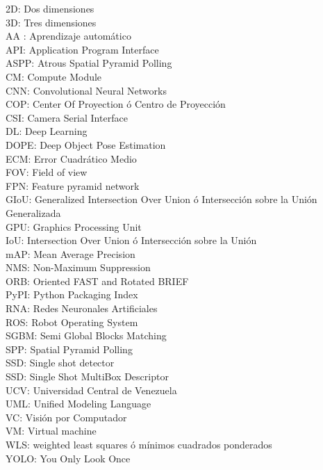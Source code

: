 2D: Dos dimensiones \\
3D: Tres dimensiones\\
AA : Aprendizaje automático \\
API: Application Program Interface \\
ASPP: Atrous Spatial Pyramid Polling\\ 
CM: Compute Module \\
CNN: Convolutional Neural Networks\\
COP: Center Of Proyection ó Centro de Proyección\\
CSI: Camera Serial Interface \\
DL: Deep Learning \\
DOPE: Deep Object Pose Estimation \\
ECM: Error Cuadrático Medio \\
FOV: Field of view\\
FPN: Feature pyramid network \\
GIoU: Generalized Intersection Over Union ó Intersección sobre la Unión Generalizada\\
GPU: Graphics  Processing Unit\\
IoU: Intersection Over Union ó Intersección sobre la Unión\\
mAP: Mean Average Precision \\
NMS: Non-Maximum Suppression \\
ORB: Oriented FAST and Rotated BRIEF\\
PyPI: Python Packaging Index \\
RNA: Redes Neuronales Artificiales \\
ROS: Robot Operating System\\
SGBM: Semi Global Blocks Matching \\
SPP: Spatial Pyramid Polling \\
SSD: Single shot detector\\
SSD: Single Shot MultiBox Descriptor\\
UCV: Universidad Central de Venezuela\\
UML: Unified Modeling Language \\
VC: Visión por Computador\\
VM: Virtual machine \\
WLS:  weighted least squares ó mínimos cuadrados ponderados \\
YOLO: You Only Look Once \\